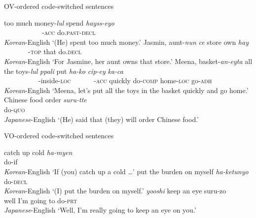 \begin{exe}
\ex\label{ex:15}   \ac{OV}-ordered code-switched sentences
    \begin{xlist}
        \ex \gll 	too much money-\textit{lul}  spend \textit{hayss-eyo}	\\
          {} {} {~~~~~~~~~~~}-\textsc{acc} {} do.\textsc{past}-\textsc{decl} \\ \hfill \textit{Korean}-English
        \glt 	‘(He) spent too much money.’   \citep{NishimuraYoon1998}
        \ex \gll 	Jasmin, aunt-\textit{nun} \textit{ce} store own \textit{hay} \\
        {} {~~~~~~~}-\textsc{top} that {} {} do.\textsc{decl}		\\  \hfill	\textit{Korean}-English
        \glt 	‘For Jasmine, her aunt owns that store.’  \citep{Choi1991}
        \ex \gll Meena, basket-\textit{an-eyta}  all the toys-\textit{lul}    \textit{ppali} put \textit{ha-ko} \textit{cip-ey} \textit{ka-ca}		 \\
        {} {~~~~~~~~~~}-inside-\textsc{loc} {} {} {~~~~~~}-\textsc{acc} quickly {} do-\textsc{comp} home-\textsc{loc} go-\textsc{adh} \\ \hfill	\textit{Korean}-English
        \glt 	‘Meena, let’s put all the toys in the basket quickly and go home.’  \citep{Lee1991}
        \ex \gll Chinese food order \textit{suru-tte} \\
        {} {} {} do-\textsc{quo} \\ \hfill \textit{Japanese}-English
        \glt ‘(He) said that (they) will order Chinese food.’ \citep{Nishimura1995}
    \end{xlist}
\newpage
\ex\label{ex:16}  \ac{VO}-ordered code-switched sentences
    \begin{xlist}
        \ex \gll catch up cold 	\textit{ha-myen} \\
        {} {} {} do-if \\  \hfill	\textit{Korean}-English
        \glt 	‘If (you) catch up a cold \dots’	 \citep{Park1990}
        \ex \gll 	put the burden on myself \textit{ha-ketunyo}	 \\
       {} {} {} {} {} do-\textsc{decl} \\ \hfill	\textit{Korean}-English
        \glt  	‘(I) put the burden on myself.’  \citet{Park1990}
        \ex \gll \textit{yooshi} keep an eye {suru-zo} \\
        {well I’m going to} {} {} {} do-\textsc{prt} \\ \hfill	\textit{Japanese}-English
        \glt 	‘Well, I’m really going to keep an eye on you.’ \citep{NambaND}
    \end{xlist}
\end{exe}

